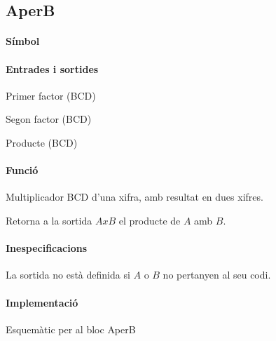 \subsection{\label{sub:\projectname-AperB} \textsf{AperB}}

\paragraph{Símbol}

\begin{center}  \end{center}

\paragraph{Entrades i sortides}

\begin{where}
\item[\nodenamerange{A}{3}{0}] Primer factor (BCD)
\item[\nodenamerange{B}{3}{0}] Segon factor (BCD)
\item[\nodenamerange{AxB}{7}{0}] Producte (BCD)
\end{where}

\paragraph{Funció}

Multiplicador BCD d'una xifra, amb resultat en dues xifres.

Retorna a la sortida $AxB$ el producte de $A$ amb $B$.

\paragraph{Inespecificacions}


La sortida no està definida si $A$ o $B$ no pertanyen al seu codi.


\paragraph{Implementació}


\begin{contendfig}
  \begin{center}
  \end{center}
  \caption{\label{fig:sch-\projectname-AperB} Esquemàtic per al bloc \textsf{AperB}}
\end{contendfig}

